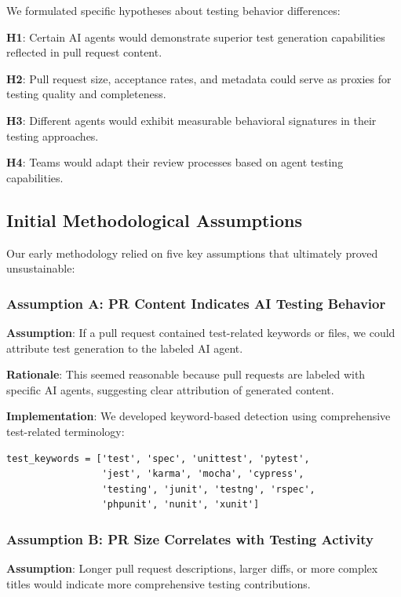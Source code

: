\documentclass[conference]{IEEEtran}
\begin{document}
We formulated specific hypotheses about testing behavior differences:

\textbf{H1}: Certain AI agents would demonstrate superior test generation capabilities reflected in pull request content.

\textbf{H2}: Pull request size, acceptance rates, and metadata could serve as proxies for testing quality and completeness.

\textbf{H3}: Different agents would exhibit measurable behavioral signatures in their testing approaches.

\textbf{H4}: Teams would adapt their review processes based on agent testing capabilities.

\subsection{Initial Methodological Assumptions}

Our early methodology relied on five key assumptions that ultimately proved unsustainable:

\subsubsection{Assumption A: PR Content Indicates AI Testing Behavior}

\textbf{Assumption}: If a pull request contained test-related keywords or files, we could attribute test generation to the labeled AI agent.

\textbf{Rationale}: This seemed reasonable because pull requests are labeled with specific AI agents, suggesting clear attribution of generated content.

\textbf{Implementation}: We developed keyword-based detection using comprehensive test-related terminology:

\begin{verbatim}
test_keywords = ['test', 'spec', 'unittest', 'pytest', 
                 'jest', 'karma', 'mocha', 'cypress', 
                 'testing', 'junit', 'testng', 'rspec',
                 'phpunit', 'nunit', 'xunit']
\end{verbatim}

\subsubsection{Assumption B: PR Size Correlates with Testing Activity}

\textbf{Assumption}: Longer pull request descriptions, larger diffs, or more complex titles would indicate more comprehensive testing contributions.
\end{document}
